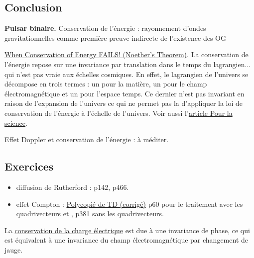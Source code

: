 \subsection*{Conclusion}

\begin{slide}
\textbf{Pulsar binaire.}
Conservation de l'énergie : rayonnement d'ondes gravitationnelles comme première preuve indirecte de l'existence des OG
\end{slide}

\begin{funfact}
\href{https://www.youtube.com/watch?v=cnGYMe6GBeQ}{When Conservation of Energy FAILS! (Noether's Theorem)}.
La conservation de l'énergie repose sur une invariance par translation dans le temps du lagrangien... qui n'est pas vraie aux échelles cosmiques.
En effet, le lagrangien de l'univers se décompose en trois termes : un pour la matière, un pour le champ électromagnétique et un pour l'espace temps.
Ce dernier n'est pas invariant en raison de l'expansion de l'univers ce qui ne permet pas la d'appliquer la loi de conservation de l'énergie à l'échelle de l'univers.
Voir aussi l'\href{https://www.pourlascience.fr/sd/cosmologie/lunivers-perd-il-de-lenergie-1774.php}{article Pour la science}.

\noindent
Effet Doppler et conservation de l'énergie : à méditer.
\end{funfact}


\subsection*{Exercices}

\begin{itemize}
\item diffusion de Rutherford : \cite{Faroux1996} p142, \cite{Michel2017} p466.
\item effet Compton : \href{http://supernovae.in2p3.fr/~llg/Enseignements/Agregation/Relativite/}{Polycopié de TD (corrigé)} p60 pour le traitement avec les quadrivecteurs et \cite{Seigne2014}, p381 sans les quadrivecteurs.
\end{itemize}

\begin{funfact}
La \href{https://www.youtube.com/watch?v=LbJJFnf-NWM}{conservation de la charge électrique} est due à une invariance de phase, ce qui est équivalent à une invariance du champ électromagnétique par changement de jauge.
\end{funfact}

\newpage
